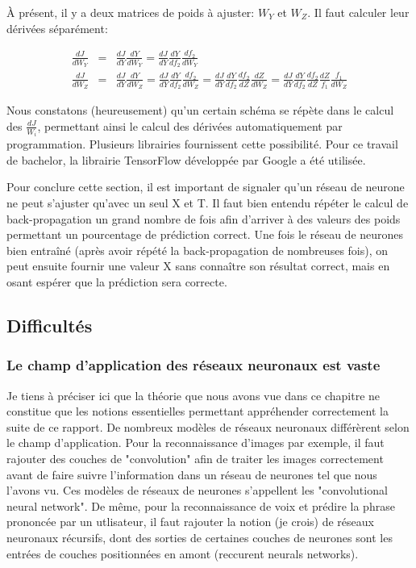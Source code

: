 \documentclass[11pt,a4paper]{report}
\begin{document}
    \par À présent, il y a deux matrices de poids à ajuster: $W_Y$ et $W_Z$. Il faut calculer leur dérivées séparément: 
    
    \begin{eqnarray}
    \frac{dJ}{dW_Y} &=& \frac{dJ}{dY} \frac{dY}{dW_Y} = \frac{dJ}{dY} \frac{dY}{df_2}\frac{df_2}{dW_Y} \\
    \frac{dJ}{dW_Z} &=& \frac{dJ}{dY} \frac{dY}{dW_Z} = \frac{dJ}{dY} \frac{dY}{df_2}\frac{df_2}{dW_Z} = \frac{dJ}{dY} \frac{dY}{df_2}\frac{df_2}{dZ}\frac{dZ}{dW_Z} = \frac{dJ}{dY} \frac{dY}{df_2}\frac{df_2}{dZ} \frac{dZ}{f_1}\frac{f_1}{dW_Z} 
    \end{eqnarray}

    \par Nous constatons (heureusement) qu'un certain schéma se répète dans le calcul des $\frac{dJ}{W_i}$, permettant ainsi le calcul des dérivées automatiquement par programmation. Plusieurs librairies fournissent cette possibilité. Pour ce travail de bachelor, la librairie TensorFlow développée par Google a été utilisée. 
    
    \par Pour conclure cette section, il est important de signaler qu'un réseau de neurone ne peut s'ajuster qu'avec un seul X et T. Il faut bien entendu répéter le calcul de back-propagation un grand nombre de fois afin d'arriver à des valeurs des poids permettant un pourcentage de prédiction correct. Une fois le réseau de neurones bien entraîné (après avoir répété la back-propagation de nombreuses fois), on peut ensuite fournir une valeur X sans connaître son résultat correct, mais en osant espérer que la prédiction sera correcte. 
  
  \subsection{Difficultés}
  
  \subsubsection{Le champ d'application des réseaux neuronaux est vaste}
  
    \par Je tiens à préciser ici que la théorie que nous avons vue dans ce chapitre ne constitue que les notions essentielles permettant appréhender correctement la suite de ce rapport. De nombreux modèles de réseaux neuronaux différèrent selon le champ d'application. Pour la reconnaissance d'images par exemple, il faut rajouter des couches de "convolution" afin de traiter les images correctement avant de faire suivre l'information dans un réseau de neurones tel que nous l'avons vu. Ces modèles de réseaux de neurones s'appellent les "convolutional neural network". De même, pour la reconnaissance de voix et prédire la phrase prononcée par un utlisateur, il faut rajouter la notion (je crois) de réseaux neuronaux récursifs, dont des sorties de certaines couches de neurones sont les entrées de couches positionnées en amont (reccurent neurals networks). 
  
\end{document}
